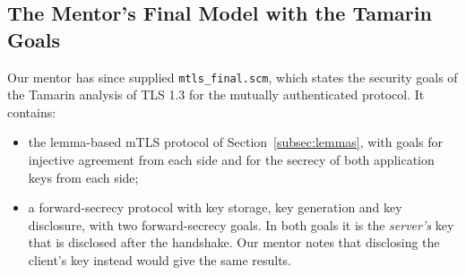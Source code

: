 \documentclass[11pt]{article}
\begin{document}
\subsection{The Mentor's Final Model with the Tamarin Goals}
\label{subsec:mtlsfinal}
Our mentor has since supplied \texttt{mtls\_final.scm}, which states the security goals of the Tamarin analysis of TLS 1.3 \cite{cremers2017tls13, meier2013tamarin} for the mutually authenticated protocol. It contains:
\begin{itemize}
    \item the lemma-based mTLS protocol of Section~\ref{subsec:lemmas}, with goals for injective agreement from each side and for the secrecy of both application keys from each side;
    \item a forward-secrecy protocol with key storage, key generation and key disclosure, with two forward-secrecy goals. In both goals it is the \textit{server's} key that is disclosed after the handshake. Our mentor notes that disclosing the client's key instead would give the same results.
\end{itemize}
\end{document}

